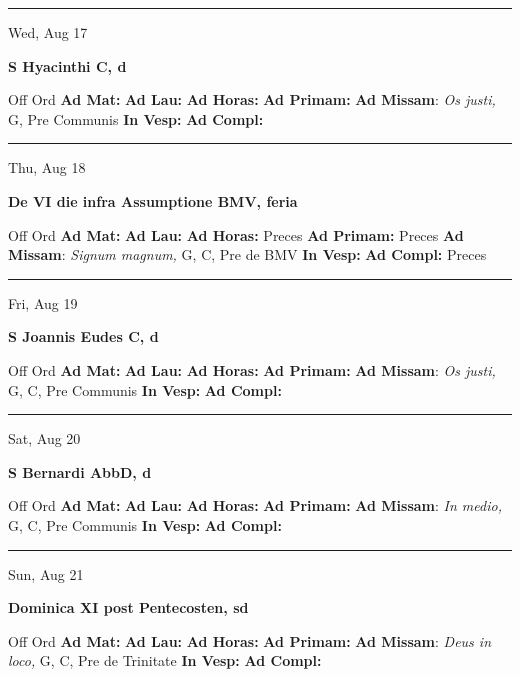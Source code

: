 \documentclass[letterpaper, 10pt]{article}
\begin{document}
\hrule
\begin{center}
Wed, Aug 17
\end{center}\textbf{ \large S Hyacinthi C, \textnormal{\normalsize d}}
\begin{justify}
Off Ord
\textbf{Ad Mat: }
\textbf{Ad Lau: }
\textbf{Ad Horas: }
\textbf{Ad Primam: }
\textbf{Ad Missam}: \textit{Os justi,} G, Pre Communis
\textbf{In Vesp: }
\textbf{Ad Compl: }\end{justify}



\hrule
\begin{center}
Thu, Aug 18
\end{center}\textbf{ \large De VI die infra Assumptione BMV, \textnormal{\normalsize feria}}
\begin{justify}
Off Ord
\textbf{Ad Mat: }
\textbf{Ad Lau: }
\textbf{Ad Horas: }Preces
\textbf{Ad Primam: }Preces
\textbf{Ad Missam}: \textit{Signum magnum,} G, C, Pre de BMV
\textbf{In Vesp: }
\textbf{Ad Compl: }Preces\end{justify}



\hrule
\begin{center}
Fri, Aug 19
\end{center}\textbf{ \large S Joannis Eudes C, \textnormal{\normalsize d}}
\begin{justify}
Off Ord
\textbf{Ad Mat: }
\textbf{Ad Lau: }
\textbf{Ad Horas: }
\textbf{Ad Primam: }
\textbf{Ad Missam}: \textit{Os justi,} G, C, Pre Communis
\textbf{In Vesp: }
\textbf{Ad Compl: }\end{justify}



\hrule
\begin{center}
Sat, Aug 20
\end{center}\textbf{ \large S Bernardi AbbD, \textnormal{\normalsize d}}
\begin{justify}
Off Ord
\textbf{Ad Mat: }
\textbf{Ad Lau: }
\textbf{Ad Horas: }
\textbf{Ad Primam: }
\textbf{Ad Missam}: \textit{In medio,} G, C, Pre Communis
\textbf{In Vesp: }
\textbf{Ad Compl: }\end{justify}



\hrule
\begin{center}
Sun, Aug 21
\end{center}\textbf{ \large Dominica XI post Pentecosten, \textnormal{\normalsize sd}}
\begin{justify}
Off Ord
\textbf{Ad Mat: }
\textbf{Ad Lau: }
\textbf{Ad Horas: }
\textbf{Ad Primam: }
\textbf{Ad Missam}: \textit{Deus in loco,} G, C, Pre de Trinitate
\textbf{In Vesp: }
\textbf{Ad Compl: }\end{justify}
\end{document}
